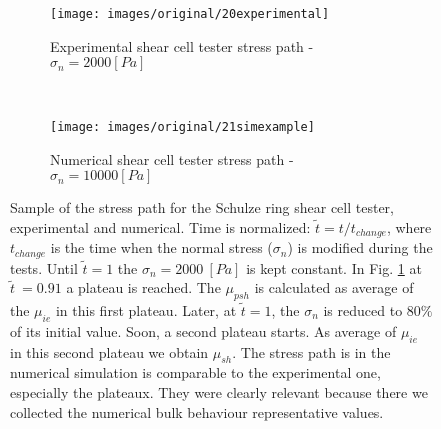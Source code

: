 \begin{figure}[htp] \centering
    \begin{subfigure}[b]{2cm}
        \texttt{[image: images/original/20experimental]}
        \caption{Experimental shear cell tester stress path - $\sigma_n = 2000
        [Pa]$}
        \label{fig:20experimental} 
    \end{subfigure}\\
        \begin{subfigure}[b]{2cm}
        \texttt{[image: images/original/21simexample]}
        \caption{Numerical shear cell tester stress path - $\sigma_n = 10000
        [Pa]$}
        \label{fig:21simexample} 
    \end{subfigure}
    \caption[Stress path]{Sample of the stress path for
	the Schulze ring shear cell tester, experimental and numerical.
	Time is normalized: $\tilde{t} = t/t_{change}$, where $t_{change}$ is the
	time when the normal stress ($\sigma_n$) is modified during the tests.
	Until $\tilde{t}=1$ the $\sigma_n = 2000 ~[Pa]$ is kept constant. 
	In Fig. \ref{fig:20experimental} at $\tilde{t}~=0.91$
 	a plateau is reached.
	The $\mu_{psh}$ is calculated as average of the $\mu_{ie}$ in this first
	plateau.
	Later, at $\tilde{t}=1$, the $\sigma_n$ is reduced to $80 \%$ of its initial
	value.
	Soon, a second plateau starts.
	As average of $\mu_{ie}$ in this second plateau we obtain $\mu_{sh}$.
	The stress path is in the numerical simulation is comparable to the
	experimental one, especially the plateaux.
	They were clearly relevant because there we collected the numerical bulk
	behaviour representative values. }
    \label{fig:40experimentalsimulation}
\end{figure}
